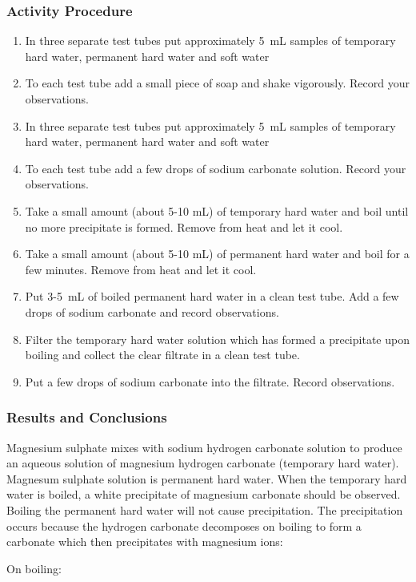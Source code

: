 {\subsubsection*{Activity Procedure}
\begin{enumerate}
\item{In three separate test tubes put approximately 5~mL samples of temporary hard water, permanent hard water and soft water}
\item{To each test tube add a small piece of soap and shake vigorously. Record your observations.}
\item{In three separate test tubes put approximately 5~mL samples of temporary hard water, permanent hard water and soft water}
\item{To each test tube add a few drops of sodium carbonate solution. Record your observations.}
\item{Take a small amount (about 5-10 mL) of temporary hard water and boil until no more precipitate is formed. Remove from heat and let it cool.}
\item{Take a small amount (about 5-10 mL) of permanent hard water and boil for a few minutes. Remove from heat and let it cool.}
\item{Put 3-5~mL of boiled permanent hard water in a clean test tube. Add a few drops of sodium carbonate and record observations.}
\item{Filter the temporary hard water solution which has formed a precipitate upon boiling and collect the clear filtrate in a clean test tube.}
\item{Put a few drops of sodium carbonate into the filtrate. Record observations.}
\end{enumerate}

\subsubsection*{Results and Conclusions}
Magnesium sulphate mixes with sodium hydrogen carbonate solution to produce  an aqueous solution of magnesium hydrogen carbonate (temporary hard water). Magnesum sulphate solution is permanent hard water. When the temporary hard water is boiled, a white precipitate of magnesium carbonate should be observed. Boiling the permanent hard water will not cause precipitation.
The precipitation occurs because the hydrogen carbonate decomposes on boiling to form a carbonate which then precipitates with magnesium ions:
\begin{center}
On boiling: \\


\end{center}}
